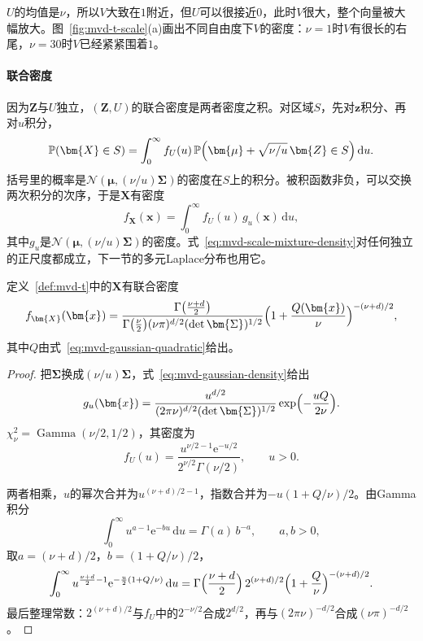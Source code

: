$U$的均值是$\nu$，所以$V$大致在$1$附近，但$U$可以很接近$0$，此时$V$很大，整个向量被大幅放大。图~\ref{fig:mvd-t-scale}(a)画出不同自由度下$V$的密度：$\nu=1$时$V$有很长的右尾，$\nu=30$时$V$已经紧紧围着$1$。

\paragraph{联合密度}
因为$\bm{Z}$与$U$独立，$(\bm{Z},U)$的联合密度是两者密度之积。对区域$S$，先对$\bm{z}$积分、再对$u$积分，
\[
 \mathbb{P}(\bm{X}\in S)=\int_0^{\infty}f_U(u)\,\mathbb{P}\Bigl(\bm{\mu}+\sqrt{\nu/u}\,\bm{Z}\in S\Bigr)\,\mathrm{d}u .
\]
括号里的概率是$\mathcal{N}(\bm{\mu},(\nu/u)\bm{\Sigma})$的密度在$S$上的积分。被积函数非负，可以交换两次积分的次序，于是$\bm{X}$有密度
\begin{equation}
 f_{\bm{X}}(\bm{x})=\int_0^{\infty}f_U(u)\,g_u(\bm{x})\,\mathrm{d}u ,
 \label{eq:mvd-scale-mixture-density}
\end{equation}
其中$g_u$是$\mathcal{N}(\bm{\mu},(\nu/u)\bm{\Sigma})$的密度。式~\eqref{eq:mvd-scale-mixture-density}对任何独立的正尺度都成立，下一节的多元Laplace分布也用它。

\begin{theorem}[多元t密度]
\label{thm:mvd-t-density}
定义~\ref{def:mvd-t}中的$\bm{X}$有联合密度
\begin{equation}
 f_{\bm{X}}(\bm{x})=\frac{\Gamma\bigl(\frac{\nu+d}{2}\bigr)}{\Gamma\bigl(\frac{\nu}{2}\bigr)(\nu\pi)^{d/2}(\det\bm{\Sigma})^{1/2}}\Bigl(1+\frac{Q(\bm{x})}{\nu}\Bigr)^{-(\nu+d)/2},
 \label{eq:mvd-t-density}
\end{equation}
其中$Q$由式~\eqref{eq:mvd-gaussian-quadratic}给出。
\end{theorem}

\begin{proof}
把$\bm{\Sigma}$换成$(\nu/u)\bm{\Sigma}$，式~\eqref{eq:mvd-gaussian-density}给出
\[
 g_u(\bm{x})=\frac{u^{d/2}}{(2\pi\nu)^{d/2}(\det\bm{\Sigma})^{1/2}}\exp\Bigl(-\frac{uQ}{2\nu}\Bigr) .
\]
$\chi^2_\nu=\operatorname{Gamma}(\nu/2,1/2)$，其密度为
\[
 f_U(u)=\frac{u^{\nu/2-1}\mathrm{e}^{-u/2}}{2^{\nu/2}\Gamma(\nu/2)},\qquad u>0 .
\]

两者相乘，$u$的幂次合并为$u^{(\nu+d)/2-1}$，指数合并为$-u(1+Q/\nu)/2$。由Gamma积分
\[
 \int_0^{\infty}u^{a-1}\mathrm{e}^{-bu}\,\mathrm{d}u=\Gamma(a)\,b^{-a},\qquad a,b>0,
\]
取$a=(\nu+d)/2$，$b=(1+Q/\nu)/2$，
\[
 \int_0^{\infty}u^{\frac{\nu+d}{2}-1}\mathrm{e}^{-\frac{u}{2}(1+Q/\nu)}\,\mathrm{d}u=\Gamma\Bigl(\frac{\nu+d}{2}\Bigr)\,2^{(\nu+d)/2}\Bigl(1+\frac{Q}{\nu}\Bigr)^{-(\nu+d)/2} .
\]
最后整理常数：$2^{(\nu+d)/2}$与$f_U$中的$2^{-\nu/2}$合成$2^{d/2}$，再与$(2\pi\nu)^{-d/2}$合成$(\nu\pi)^{-d/2}$。
\end{proof}

